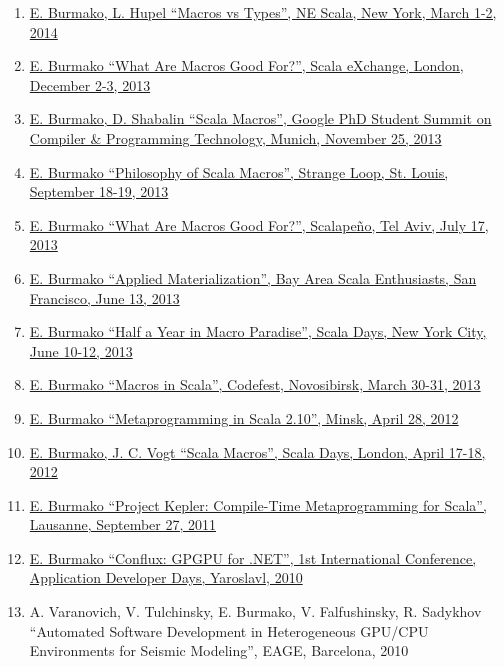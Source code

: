 \documentclass[margin, 10pt]{Stylesheet}
\begin{document}
\begin{resume}
\begin{enumerate}
\item \href{http://scalamacros.org/paperstalks/2014-03-01-MacrosVsTypes.pdf}{E. Burmako, L. Hupel ``Macros vs Types'', NE Scala, New York, March 1-2, 2014}
\item \href{http://scalamacros.org/paperstalks/2014-02-04-WhatAreMacrosGoodFor.pdf}{E. Burmako ``What Are Macros Good For?'', Scala eXchange, London, December 2-3, 2013}
\item \href{http://scalamacros.org/paperstalks/2013-11-25-ScalaMacrosPoster.pdf}{E. Burmako, D. Shabalin ``Scala Macros'', Google PhD Student Summit on Compiler \& Programming Technology, Munich, November 25, 2013}
\item \href{http://scalamacros.org/paperstalks/2013-09-19-PhilosophyOfScalaMacros.pdf}{E. Burmako ``Philosophy of Scala Macros'', Strange Loop, St. Louis, September 18-19, 2013}
\item \href{http://scalamacros.org/paperstalks/2014-02-04-WhatAreMacrosGoodFor.pdf}{E. Burmako ``What Are Macros Good For?'', Scalape\~{n}o, Tel Aviv, July 17, 2013}
\item \href{http://scalamacros.org/paperstalks/2013-06-13-AppliedMaterialization.pdf}{E. Burmako ``Applied Materialization'', Bay Area Scala Enthusiasts, San Francisco, June 13, 2013}
\item \href{http://scalamacros.org/paperstalks/2013-06-12-HalfYearInMacroParadise.pdf}{E. Burmako ``Half a Year in Macro Paradise'', Scala Days, New York City, June 10-12, 2013}
\item \href{https://github.com/scalamacros/scalamacros.github.com/raw/master/paperstalks/2013-03-31-ScalaMacros.pdf}{E. Burmako ``Macros in Scala'', Codefest, Novosibirsk, March 30-31, 2013}
\item \href{https://github.com/scalamacros/scalamacros.github.com/raw/master/paperstalks/2012-04-28-MetaprogrammingInScala210.pdf}{E. Burmako ``Metaprogramming in Scala 2.10'', Minsk, April 28, 2012}
\item \href{https://github.com/scalamacros/scalamacros.github.com/raw/master/paperstalks/2012-04-18-ScalaDays2012.pdf}{E. Burmako, J. C. Vogt ``Scala Macros'', Scala Days, London, April 17-18, 2012}
\item \href{https://github.com/scalamacros/scalamacros.github.com/raw/master/paperstalks/2011-09-27-ProjectKepler.pdf}{E. Burmako ``Project Kepler: Compile-Time Metaprogramming for Scala'', Lausanne, September 27, 2011}
\item \href{https://code.google.com/archive/p/conflux/downloads}{E. Burmako ``Conflux: GPGPU for .NET'', 1st International Conference, Application Developer Days, Yaroslavl, 2010}
\item A. Varanovich, V. Tulchinsky, E. Burmako, V. Falfushinsky, R. Sadykhov ``Automated Software Development in Heterogeneous GPU/CPU Environments for Seismic Modeling'', EAGE, Barcelona, 2010
\end{enumerate}


\end{resume}
\end{document}
